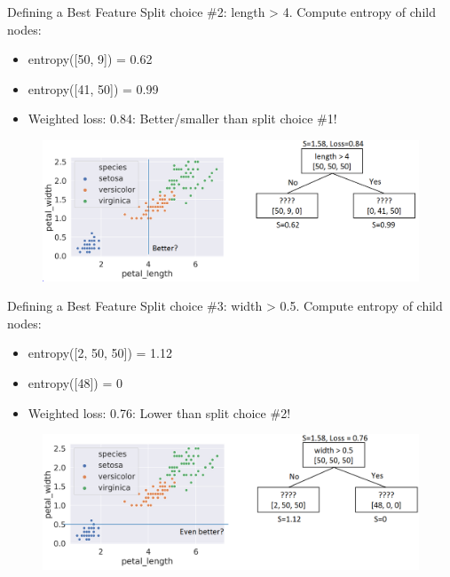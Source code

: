 \documentclass[aspectratio=169]{../latex_main/tntbeamer}  %
\begin{document}
	
	\begin{frame}{Defining a Best Feature}
	    Split choice \#2: length > 4. Compute entropy of child nodes:
	    \begin{itemize}
	        \item entropy([50, 9]) = 0.62
	        \item entropy([41, 50]) = 0.99
	        \item Weighted loss: 0.84: \alert{Better/smaller than split choice \#1!}
	    \end{itemize}
	    
	    \begin{figure}
	        \centering
	        \includegraphics[scale=.4]{Bild49}
	    \end{figure}
	\end{frame}
	
	
	\begin{frame}{Defining a Best Feature}
	    Split choice \#3: width > 0.5. Compute entropy of child nodes:
	    \begin{itemize}
	        \item entropy([2, 50, 50]) = 1.12
	        \item entropy([48]) = 0
	        \item Weighted loss: 0.76: \alert{Lower than split choice \#2!}

	    \end{itemize}
	    
	    \begin{figure}
	        \centering
	        \includegraphics[scale=.4]{Bild50}
	    \end{figure}
	\end{frame}
	
\end{document}
